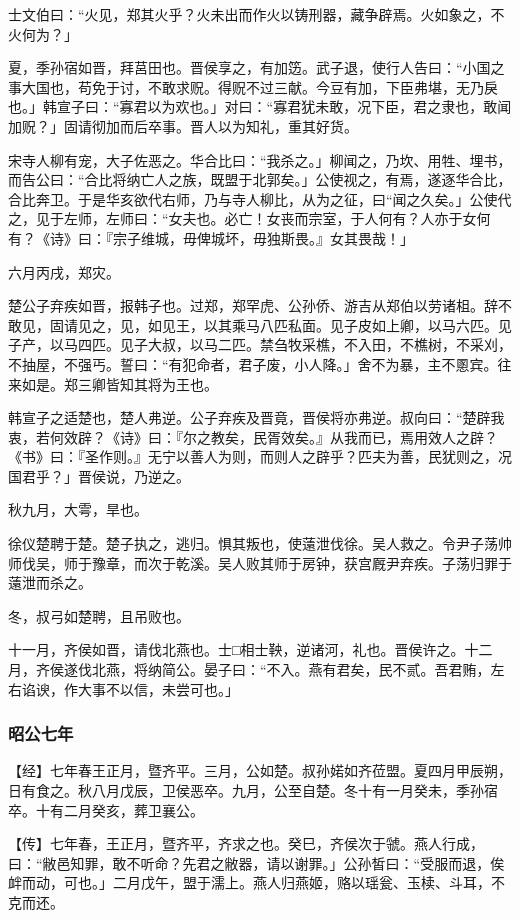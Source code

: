 \documentclass[]{article}
\begin{document}
士文伯曰：``火见，郑其火乎？火未出而作火以铸刑器，藏争辟焉。火如象之，不火何为？」

夏，季孙宿如晋，拜莒田也。晋侯享之，有加笾。武子退，使行人告曰：``小国之事大国也，苟免于讨，不敢求贶。得贶不过三献。今豆有加，下臣弗堪，无乃戾也。」韩宣子曰：``寡君以为欢也。」对曰：``寡君犹未敢，况下臣，君之隶也，敢闻加贶？」固请彻加而后卒事。晋人以为知礼，重其好货。

宋寺人柳有宠，大子佐恶之。华合比曰：``我杀之。」柳闻之，乃坎、用牲、埋书，而告公曰：``合比将纳亡人之族，既盟于北郭矣。」公使视之，有焉，遂逐华合比，合比奔卫。于是华亥欲代右师，乃与寺人柳比，从为之征，曰``闻之久矣。」公使代之，见于左师，左师曰：``女夫也。必亡！女丧而宗室，于人何有？人亦于女何有？《诗》曰：『宗子维城，毋俾城坏，毋独斯畏。』女其畏哉！」

六月丙戌，郑灾。

楚公子弃疾如晋，报韩子也。过郑，郑罕虎、公孙侨、游吉从郑伯以劳诸柤。辞不敢见，固请见之，见，如见王，以其乘马八匹私面。见子皮如上卿，以马六匹。见子产，以马四匹。见子大叔，以马二匹。禁刍牧采樵，不入田，不樵树，不采刈，不抽屋，不强丐。誓曰：``有犯命者，君子废，小人降。」舍不为暴，主不慁宾。往来如是。郑三卿皆知其将为王也。

韩宣子之适楚也，楚人弗逆。公子弃疾及晋竟，晋侯将亦弗逆。叔向曰：``楚辟我衷，若何效辟？《诗》曰：『尔之教矣，民胥效矣。』从我而已，焉用效人之辟？《书》曰：『圣作则。』无宁以善人为则，而则人之辟乎？匹夫为善，民犹则之，况国君乎？」晋侯说，乃逆之。

秋九月，大雩，旱也。

徐仪楚聘于楚。楚子执之，逃归。惧其叛也，使薳泄伐徐。吴人救之。令尹子荡帅师伐吴，师于豫章，而次于乾溪。吴人败其师于房钟，获宫厩尹弃疾。子荡归罪于薳泄而杀之。

冬，叔弓如楚聘，且吊败也。

十一月，齐侯如晋，请伐北燕也。士□相士鞅，逆诸河，礼也。晋侯许之。十二月，齐侯遂伐北燕，将纳简公。晏子曰：``不入。燕有君矣，民不贰。吾君贿，左右谄谀，作大事不以信，未尝可也。」

\hypertarget{header-n2480}{%
\subsubsection{昭公七年}\label{header-n2480}}

【经】七年春王正月，暨齐平。三月，公如楚。叔孙婼如齐莅盟。夏四月甲辰朔，日有食之。秋八月戊辰，卫侯恶卒。九月，公至自楚。冬十有一月癸未，季孙宿卒。十有二月癸亥，葬卫襄公。

【传】七年春，王正月，暨齐平，齐求之也。癸巳，齐侯次于虢。燕人行成，曰：``敝邑知罪，敢不听命？先君之敝器，请以谢罪。」公孙皙曰：``受服而退，俟衅而动，可也。」二月戊午，盟于濡上。燕人归燕姬，赂以瑶瓮、玉椟、斗耳，不克而还。
\end{document}
